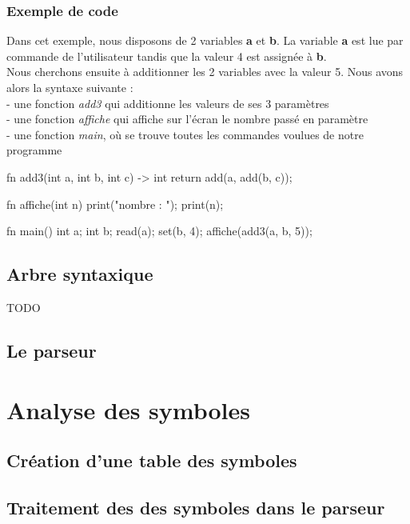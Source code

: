 \documentclass[a4paper]{article}%
\begin{document}
\subsubsection{Exemple de code}

Dans cet exemple, nous disposons de 2 variables \textbf{a} et \textbf{b}. La
variable \textbf{a} est lue par commande de l'utilisateur tandis que la valeur 4
est assignée à \textbf{b}.\\
Nous cherchons ensuite à additionner les 2 variables avec la valeur 5. Nous avons alors la syntaxe suivante :\\
- une fonction \textit{add3} qui additionne les valeurs de ses 3 paramètres\\
- une fonction \textit{affiche} qui affiche sur l'écran le nombre passé en paramètre\\
- une fonction \textit{main}, où se trouve toutes les commandes voulues de notre programme\\

\begin{grammar}[language=C++]
fn add3(int a, int b, int c) -> int {
    return add(a, add(b, c));
}

fn affiche(int n) {
    print("nombre : ");
    print(n);
}

fn main() {
    int a;
    int b;
    read(a);
    set(b, 4);
    affiche(add3(a, b, 5));
}
\end{grammar}\leavevmode\newline


\clearpage{}%

\subsection{Arbre syntaxique}

TODO

\subsection{Le parseur}

\section{Analyse des symboles}
\subsection{Création d'une table des symboles}
\subsection{Traitement des des symboles dans le parseur}
\end{document}
